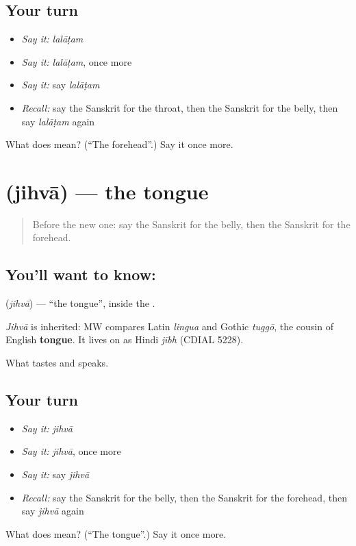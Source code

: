 \subsection*{Your turn}
\begin{itemize}
\raggedright
  \item \emph{Say it:} \emph{lalāṭam}
  \item \emph{Say it:} \emph{lalāṭam}, once more
  \item \emph{Say it:} say \emph{lalāṭam}
  \item \emph{Recall:} say the Sanskrit for the throat, then the Sanskrit for the belly, then say \emph{lalāṭam} again
\end{itemize}

\begin{tcolorbox}[breakable,colback=teal!4,colframe=teal!35!black,title={Before you move on}]
What does  mean? (\textquotedblleft{}The forehead\textquotedblright{}.) Say it once more.
\end{tcolorbox}
\section[\texorpdfstring{\sk{जिह्वा} (jihvā)}{जिह्वा (jihvā)}]{ (jihvā) — the tongue}

\label{lesson:SA-C69-tongue}



\begin{quote}
Before the new one: say the Sanskrit for the belly, then the Sanskrit for the forehead.
\end{quote}

\subsection*{You'll want to know: }
\textbf{} (\emph{jihvā}) — \textquotedblleft{}the tongue\textquotedblright{}, inside the \textbf{}.

\begin{cousinweb}
\emph{Jihvā} is inherited: MW compares Latin \emph{lingua} and Gothic \emph{tuggō}, the cousin of English \textbf{tongue}. It lives on as Hindi \emph{jībh} (CDIAL 5228).
\end{cousinweb}

\begin{grammarlens}[title={What you've built}]
What tastes and speaks.
\end{grammarlens}

\subsection*{Your turn}
\begin{itemize}
\raggedright
  \item \emph{Say it:} \emph{jihvā}
  \item \emph{Say it:} \emph{jihvā}, once more
  \item \emph{Say it:} say \emph{jihvā}
  \item \emph{Recall:} say the Sanskrit for the belly, then the Sanskrit for the forehead, then say \emph{jihvā} again
\end{itemize}

\begin{tcolorbox}[breakable,colback=teal!4,colframe=teal!35!black,title={Before you move on}]
What does  mean? (\textquotedblleft{}The tongue\textquotedblright{}.) Say it once more.
\end{tcolorbox}
